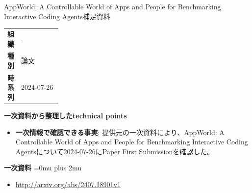 \begin{technicalnote}{AppWorld: A Controllable World of Apps and People for Benchmarking Interactive Coding Agents}{補足資料}
\begingroup
\begin{tabularx}{\linewidth}{@{}>{\bfseries}p{0.22\linewidth}X@{}}
組織 & - \\
種別 & 論文 \\
時系列 & 2024-07-26 \\
\end{tabularx}
\smallskip
{\bfseries 一次資料から整理したtechnical points}
\begin{itemize}[leftmargin=1.5em,itemsep=0.35em]
\item \textbf{一次情報で確認できる事実}: 提供元の一次資料により、AppWorld: A Controllable World of Apps and People for Benchmarking Interactive Coding Agentsについて2024-07-26にPaper First Submissionを確認した。
\end{itemize}
\begin{minipage}{\linewidth}
\begin{samepage}
{\bfseries 一次資料}
\begingroup\sloppy
\Urlmuskip=0mu plus 2mu\relax
\begin{itemize}[leftmargin=1.5em,itemsep=0.25em]
\item {\scriptsize\url{http://arxiv.org/abs/2407.18901v1}}
\end{itemize}
\endgroup
\end{samepage}
\end{minipage}
\endgroup
\end{technicalnote}
\medskip

